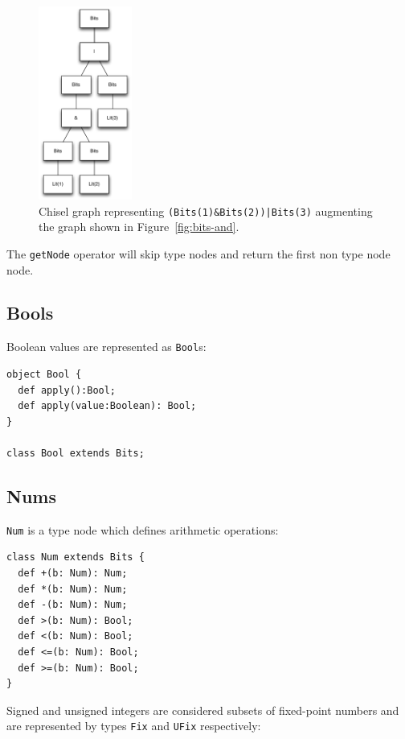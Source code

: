 \documentclass[10pt,twocolumn]{article}
\def\code#1{{\small\tt #1}}
\begin{document}
\begin{figure}[h]
\centering
\includegraphics[height=2.5in]{figs/bits-or-and.pdf}
\caption{Chisel graph representing 
  {\tt\footnotesize (Bits(1)\&Bits(2))|Bits(3)} augmenting the graph
  shown in Figure~\ref{fig:bits-and}.}
\label{fig:bits-or-and}
\end{figure}

\noindent
The \code{getNode} operator will skip type nodes and return the first
non type node node.

\subsection{Bools}

Boolean values are represented as \code{Bool}s:

\begin{lstlisting}
object Bool {
  def apply():Bool;
  def apply(value:Boolean): Bool;
}

class Bool extends Bits;
\end{lstlisting}

\subsection{Nums}

\code{Num} is a type node which defines arithmetic operations:

\begin{lstlisting}
class Num extends Bits {
  def +(b: Num): Num;
  def *(b: Num): Num;
  def -(b: Num): Num;
  def >(b: Num): Bool;
  def <(b: Num): Bool;
  def <=(b: Num): Bool;
  def >=(b: Num): Bool;
}
\end{lstlisting}

Signed and unsigned integers
are considered subsets of fixed-point numbers and are represented by
types \code{Fix} and \code{UFix} respectively:
\end{document}
